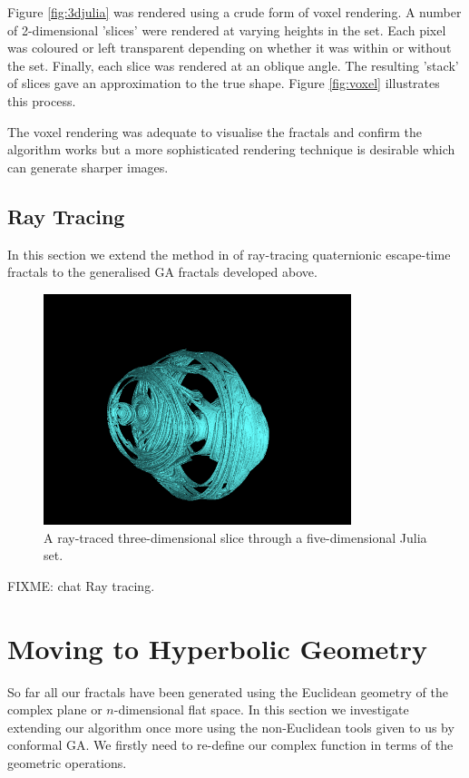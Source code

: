 Figure \ref{fig:3djulia} was rendered using a crude form of voxel rendering. A
number of 2-dimensional 'slices' were rendered at varying heights in the set. Each
pixel was coloured or left transparent depending on whether it was within or without
the set. Finally, each slice was rendered at an oblique angle. The resulting
'stack' of slices gave an approximation to the true shape. Figure
\ref{fig:voxel} illustrates this process.

The voxel rendering was adequate to visualise the fractals and confirm the algorithm
works but a more sophisticated rendering technique is desirable which can generate
sharper images.

\subsection{Ray Tracing}

In this section we extend the method in \cite{FRAC:HypercomplexIterations} of 
ray-tracing quaternionic escape-time fractals to the generalised GA fractals developed 
above.


\begin{figure}
\centering
\includegraphics[width=0.8\textwidth]{5djulia}
\caption{\label{fig:5djulia}
  A ray-traced three-dimensional slice through a five-dimensional Julia set.
}
\end{figure}

FIXME: chat Ray tracing.

\section{Moving to Hyperbolic Geometry}

So far all our fractals have been generated using the Euclidean geometry of the complex plane
or $n$-dimensional flat space. In this section we investigate extending our algorithm once
more using the non-Euclidean tools given to us by conformal GA. We firstly need to re-define 
our complex function in terms of the geometric operations.

